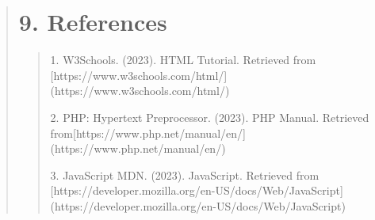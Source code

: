 \documentclass[12pt]{report}
\begin{document}
	\begin{quote}
		\section{9. References}
		\begin{quote}
			1. W3Schools. (2023). HTML Tutorial. Retrieved from [https://www.w3schools.com/html/]\\(https://www.w3schools.com/html/)
			
			2. PHP: Hypertext Preprocessor. (2023). PHP Manual. Retrieved from[https://www.php.net/manual/en/]\\(https://www.php.net/manual/en/)
			
			3. JavaScript MDN. (2023). JavaScript. Retrieved from [https://developer.mozilla.org/en-US/docs/Web/JavaScript]\\(https://developer.mozilla.org/en-US/docs/Web/JavaScript)
			
		\end{quote}
	\end{quote}
	
\end{document}
